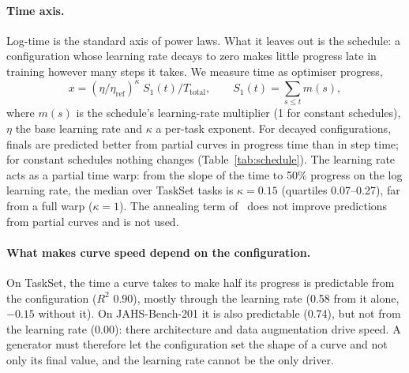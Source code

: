 \documentclass[10pt]{article}
\begin{document}
\begin{table}[t]
\centering\small
\caption{Loss scale, compared on fit tasks (medians over tasks; bold: the better scale). Predictions use the first
40\% of each curve. ``Current value'': ranking finals by the value at 40\%, for scale. Error of finals: median
absolute error as a share of the task range. Noise slope $k$: residual sd $\propto$ excess$^k$. NAS-Bench-201 has
only 3 fit tasks.}
\label{tab:repr}
\resizebox{\linewidth}{!}{}
\end{table}

\paragraph{Time axis.} Log-time is the standard axis of power laws. What it leaves out is the schedule: a
configuration whose learning rate decays to zero makes little progress late in training however many steps it
takes. We measure time as optimiser progress,
\begin{equation}
  x = (\eta/\eta_\text{ref})^{\kappa}\; S_1(t)/T_\text{total}, \qquad S_1(t) = \textstyle\sum_{s \le t} m(s),
  \label{eq:progress}
\end{equation}
where $m(s)$ is the schedule's learning-rate multiplier (1 for constant schedules), $\eta$ the base learning rate
and $\kappa$ a per-task exponent. For decayed configurations, finals are predicted better from partial curves in
progress time than in step time; for constant schedules nothing changes (Table~\ref{tab:schedule}). The learning
rate acts as a partial time warp: from the slope of the time to 50\% progress on the log learning rate, the median
over TaskSet tasks is $\kappa = 0.15$ (quartiles 0.07--0.27), far from a full warp ($\kappa = 1$). The annealing term
of~\cite{tissue2024scaling} does not improve predictions from partial curves and is not used.

\begin{table}[t]
\centering\small
\caption{Time axis, compared on TaskSet fit tasks with schedule hyperparameters: Eq.~\eqref{eq:bpl} fitted on the first
40\% of each curve on the log-excess scale, in step time or in progress time $S_1$ (Eq.~\ref{eq:progress}). Bold: the
better axis (none if equal). Error of finals as a share of the task range. nadamw with an (almost) constant schedule
has too few curves per task to rank.}
\label{tab:schedule}

\end{table}

\paragraph{What makes curve speed depend on the configuration.} On TaskSet, the time a curve takes to make half its
progress is predictable from the configuration ($R^2$ 0.90), mostly through the learning rate (0.58 from it alone,
$-0.15$ without it). On JAHS-Bench-201 it is also predictable (0.74), but not from the learning rate (0.00): there
architecture and data augmentation drive speed. A generator must therefore let the configuration set the shape of
a curve and not only its final value, and the learning rate cannot be the only driver.
\end{document}
